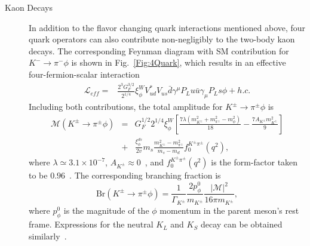 \documentclass[letterpaper,11pt]{article}
\begin{document}
\begin{description}
\item[Kaon Decays]
In addition to the flavor changing quark interactions mentioned above, four quark operators can also contribute non-negligibly to the two-body kaon decays. The corresponding Feynman diagram with SM contribution for $K^-\rightarrow \pi^-\phi$ is shown in Fig.~\ref{Fig:4Quark}, 
which results in an effective four-fermion-scalar interaction
\begin{align}
    \mathcal{L}_{eff}=&\frac{2^3 G_F^{3/2}}{2^{1/4}}\xi_{\phi}^W V_{ud}^* V_{us}\bar{d}\gamma^\mu P_L u\bar{u}\gamma_\mu P_L s\phi +h.c.  
     \label{Eq:Lag_4FH}
\end{align}
Including both contributions,   the total amplitude for $K^\pm \rightarrow \pi^\pm\phi$ is~\cite{Leutwyler:1989xj, Gunion:1989we, Bezrukov:2009yw, Feng:2017vli, Boiarska:2019jym} 
\begin{eqnarray}
    \mathcal{M} (K^\pm \rightarrow \pi^\pm\phi) &=&G_F^{1/2}2^{1/4}\xi_{\phi}^W\left[\frac{7\lambda(m_{K^\pm}^2+m_{\pi^\pm}^2-m_\phi^2)}{18}-\frac{7A_{K^\pm}m_{K^\pm}^2}{9}\right] \nonumber \\ &+&\frac{\xi^{ds}_\phi}{2v}m_{s}\frac{m_{K^\pm}^2-m_{\pi^\pm}^2}{m_{s}-m_{d}}f_0^{K^\pm \pi^\pm}(q^2),
    \label{Eq:Matrix_4FH}
\end{eqnarray}
  where $\lambda\simeq 3.1\times 10^{-7}$, $A_{K^\pm} \approx 0$~\cite{Leutwyler:1989xj, Gunion:1989we, Bezrukov:2009yw, Feng:2017vli}, and $f_0^{K^\pm\pi^\pm}(q^2)$ is the form-factor taken to be $0.96$~\cite{Boiarska:2019jym}.     The corresponding branching fraction is
\begin{equation}
    \text{Br}(K^\pm\rightarrow \pi^\pm \phi)=\frac{1}{\Gamma_{K^\pm}}\frac{2p_\phi^0}{m_{K^\pm}}\frac{|\mathcal{M}|^2}{16\pi m_{K^\pm}}  ,
 \end{equation}
where $p_\phi^0$ is the magnitude of the $\phi$  momentum in the parent meson’s rest frame.     Expressions for the neutral $K_L$ and $K_S$ decay can be obtained similarly~\cite{Leutwyler:1989xj, Gunion:1989we, Bezrukov:2009yw, Feng:2017vli}.     


\end{description}
\end{document}
